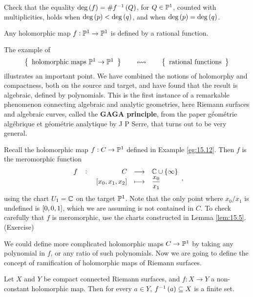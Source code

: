 \begin{exercise}
Check that the equality $ \deg\br{f} = \#f^{-1}\br{Q} $, for $ Q \in \P^1 $, counted with multiplicities, holds when $ \deg\br{p} < \deg\br{q} $, and when $ \deg\br{p} = \deg\br{q} $.
\end{exercise}

\begin{exercise}
Any holomorphic map $ f : \P^1 \to \P^1 $ is defined by a rational function.
\end{exercise}

\begin{remark}
The example of
$$ \correspondence{\text{holomorphic maps} \ \P^1 \to \P^1}{\text{rational functions}} $$
illustrates an important point. We have combined the notions of holomorphy and compactness, both on the source and target, and have found that the result is algebraic, defined by polynomials. This is the first instance of a remarkable phenomenon connecting algebraic and analytic geometries, here Riemann surfaces and algebraic curves, called the \textbf{GAGA principle}, from the paper g\'eom\'etrie alg\'ebrique et g\'eom\'etrie analytique by J P Serre, that turns out to be very general.
\end{remark}

\begin{example}
Recall the holomorphic map $ f : C \to \P^1 $ defined in Example \ref{eg:15.12}. Then $ f $ is the meromorphic function
$$ \function[f]{C}{\C \cup \cbr{\infty}}{\sbr{x_0, x_1, x_2}}{\dfrac{x_0}{x_1}}, $$
using the chart $ U_1 = \C $ on the target $ \P^1 $. Note that the only point where $ x_0 / x_1 $ is undefined is $ \sbr{0, 0, 1} $, which we are assuming is not contained in $ C $. To check carefully that $ f $ is meromorphic, use the charts constructed in Lemma \ref{lem:15.5}. (Exercise)
\end{example}


We could define more complicated holomorphic maps $ C \to \P^1 $ by taking any polynomial in $ f $, or any ratio of such polynomials. Now we are going to define the concept of ramification of holomorphic maps of Riemann surfaces.

\begin{proposition}
\label{prop:17.7}
Let $ X $ and $ Y $ be compact connected Riemann surfaces, and $ f : X \to Y $ a non-constant holomorphic map. Then for every $ a \in Y $, $ f^{-1}\br{a} \subseteq X $ is a finite set.
\end{proposition}

